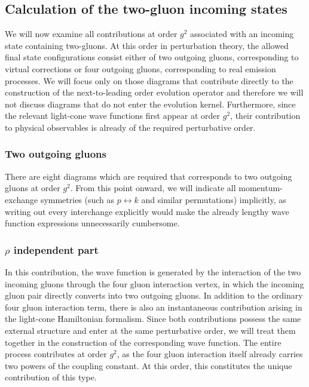 \documentclass[a4paper,11pt]{article}
\begin{document}
\subsection{Calculation of the two-gluon incoming states}\label{sec:Twoglue}
We will now examine all contributions at order $g^{2}$ associated with an incoming state containing two-gluons. At this order in perturbation theory, the allowed final state configurations consist either of two outgoing gluons, corresponding to virtual corrections or four outgoing gluons, corresponding to real emission processes. We will focus only on those diagrams that contribute directly to the construction of the next-to-leading order evolution operator and therefore we will not discuss diagrams that do not enter the evolution kernel. Furthermore, since the relevant light-cone wave functions first appear at order $g^{2}$, their contribution to physical observables is already of the required perturbative order.

\subsubsection{Two outgoing gluons}
There are {\color{chg}eight} diagrams which are required that corresponds to two outgoing gluons at order $g^{2}$. From this point onward, we will indicate all momentum-exchange symmetries (such as $p\leftrightarrow k$ and similar permutations) implicitly, as writing out every interchange explicitly would make the already lengthy wave function expressions unnecessarily cumbersome.

\subsubsection*{$\rho$ independent part}
In this contribution, the wave function is generated by the interaction of the two incoming gluons through the four gluon interaction vertex, in which the incoming gluon pair directly converts into two outgoing gluons. In addition to the ordinary four gluon interaction term, there is also an instantaneous contribution arising in the light-cone Hamiltonian formalism. Since both contributions possess the same external structure and enter at the same perturbative order, we will treat them together in the construction of the corresponding wave function. The entire process contributes at order $g^{2}$, as the four gluon interaction itself already carries two powers of the coupling constant. At this order, this constitutes the unique contribution of this type.
\end{document}
